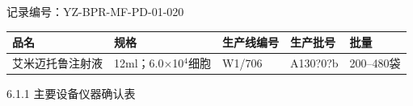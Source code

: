 \documentclass[UTF8,10pt,a4paper,fontset=fandol]{ctexart}
\newcommand{\fieldvalue}[1]{#1}
\newcommand{\handwritten}[1]{#1}
\begin{document}
\noindent
记录编号：YZ-BPR-MF-PD-01-020 \hfill
\begin{tabular}{|p{2.4cm}|p{2.4cm}|p{2.4cm}|p{2.4cm}|p{2.4cm}|}
\hline
品名 & 规格 & 生产线编号 & 生产批号 & 批量\\
\hline
艾米迈托鲁注射液 & 12ml；6.0$\times$10$^{4}$细胞 &
\fieldvalue{\handwritten{W1/706}} &
\fieldvalue{\handwritten{A130?0?b}} &
200--480袋\\
\hline
\end{tabular}

\vspace{0.4em}

6.1.1 主要设备仪器确认表
\end{document}
